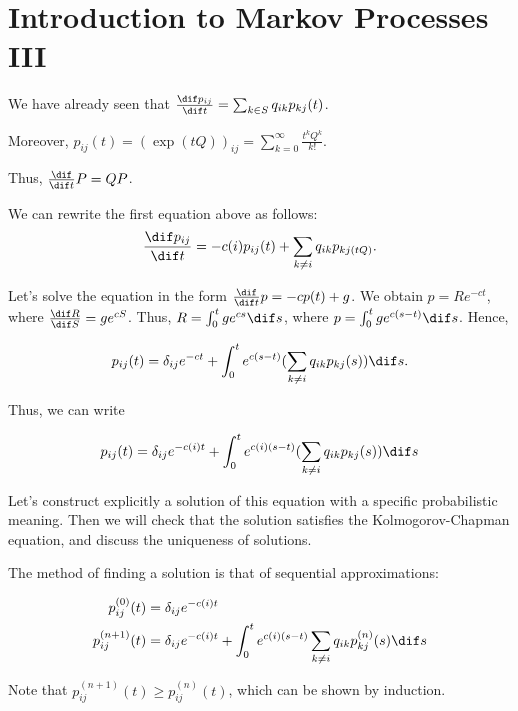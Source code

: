 \documentclass[11pt]{scrartcl}
\begin{document}
  \section{Introduction to Markov Processes III}

  We have already seen that
  $\frac{\dif p_{ij}}{\dif t} = \sum_{k\in S} q_{ik} p_{kj}(t)$.

  Moreover,
  $p_{ij}(t) = (\exp(tQ))_{ij} =
  \sum_{k=0}^{\infty}\frac{t^{k}Q^{k}}{k!}$.

  Thus, $\frac{\dif }{\dif t} P = QP$.

  We can rewrite the first equation above as follows:
  \begin{equation*}
    \frac{\dif  p_{ij}}{\dif t} = -c(i)p_{ij}(t) + \sum_{k\neq i}q_{ik}p_{kj(tQ)}.
  \end{equation*}

  Let's solve the equation in the form
  $\frac{\dif }{\dif t}p = - cp(t)+g $. We obtain $p = Re^{-ct}$,
  where $\frac{\dif R}{\dif S} = ge^{cS}$. Thus,
  $R = \int_{0}^{t}ge^{cs}\dif s$, where
  $p = \int_{0}^{t}ge^{c(s-t)}\dif s$. Hence,
  
  \begin{equation*}
    p_{ij}(t) = \delta_{ij}e^{-ct} + \int_{0}^{t}e^{c(s- t)}(\sum_{k\neq i}q_{ik}p_{kj}(s))\dif s.
  \end{equation*}

  Thus, we can write
  
  \begin{equation*}
    p_{ij}(t) = \delta_{ij}e^{- c(i)t} + \int_{0}^{t}e^{c(i)(s-t)}(\sum_{k\neq i} q_{ik}p_{kj}(s))\dif s
  \end{equation*}

  Let's construct explicitly a solution of this equation with a
  specific probabilistic meaning. Then we will check that the solution
  satisfies the Kolmogorov-Chapman equation, and discuss the
  uniqueness of solutions.

  The method of finding a solution is that of sequential approximations:

  \begin{align}
    p_{ij}^{(0)}(t) &= \delta_{ij}e^{-c(i)t}\\
    p_{ij}^{(n+1)}(t) &= \delta_{ij}e^{-c(i)t} + \int_{0}^{t}e^{c(i)(s-t)}\sum_{k\neq i}q_{ik}p_{kj}^{(n)}(s)\dif s
  \end{align}

  Note that $p_{ij}^{(n+1)}(t) \geq p_{ij}^{(n)}(t)$, which can be shown by induction.
\end{document}
